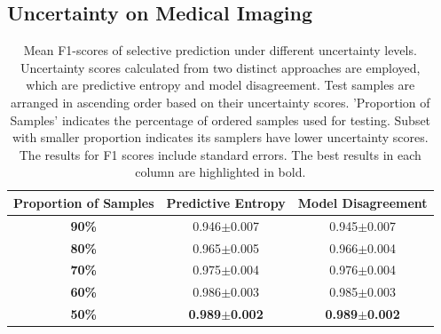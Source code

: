 \documentclass[10pt]{article} %
\begin{document}
\subsection{Uncertainty on Medical Imaging}
\label{app:uncertainty_on_medical_imaging}
\begin{table}[!htp]
\caption{Mean F1-scores of selective prediction under different uncertainty levels. Uncertainty scores calculated from two distinct approaches are employed, which are predictive entropy and model disagreement. Test samples are arranged in ascending order based on their uncertainty scores. 'Proportion of Samples' indicates the percentage of ordered samples used for testing. Subset with smaller proportion indicates
its samplers have lower uncertainty scores. The results for F1 scores include standard errors. The best results in each column are highlighted in bold.}
\label{table: VIFA_uncertainty_f1_score}
\begin{center}
\begin{tabular}{c|cc}
\textbf{Proportion of Samples} & \textbf{Predictive Entropy} & \textbf{Model Disagreement} \\ \hline
\textbf{90\%}                               & 0.946$\pm$0.007                 & 0.945$\pm$0.007                 \\
\textbf{80\%}                               & 0.965$\pm$0.005                 & 0.966$\pm$0.004                 \\
\textbf{70\%}                               & 0.975$\pm$0.004                 & 0.976$\pm$0.004                 \\
\textbf{60\%}                               & 0.986$\pm$0.003                 & 0.985$\pm$0.003                 \\
\textbf{50\%}                               & \textbf{0.989$\pm$0.002}                 & \textbf{0.989$\pm$0.002}                
\end{tabular}
\end{center}
\end{table}
\end{document}
